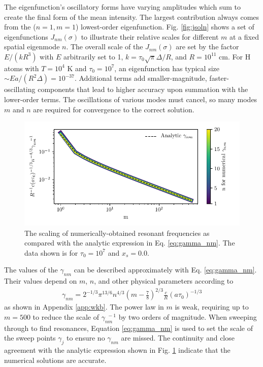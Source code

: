 \documentclass{aastex63}
\newcommand{\be}{\begin{eqnarray}}
\newcommand{\ee}{\end{eqnarray}}
\begin{document}
The eigenfunction's oscillatory forms have varying amplitudes which sum to create the final form of the mean intensity. The largest contribution always comes from the ($n=1, m=1$) lowest-order eigenfunction. Fig. \ref{fig:jsoln} shows a set of eigenfunctions $J_{nm}(\sigma)$ to illustrate their relative scales for different $m$ at a fixed spatial eigenmode $n$. The overall scale of the $J_{nm}(\sigma)$ are set by the factor $E/(kR^3)$ with $E$ arbitrarily set to 1, $k = \tau_0 \sqrt{\pi} \Delta / R$, and $R = 10^{11}$ cm. For H atoms with $T=10^4$ K and $\tau_0=10^7$, an eigenfunction has typical size ${\sim} E a / \left(R^2 \Delta \right) = 10^{-37}$. Additional terms add smaller-magnitude, faster-oscillating components that lead to higher accuracy upon summation with the lower-order terms. The oscillations of various modes must cancel, so many modes $m$ and $n$ are required for convergence to the correct solution. 
\begin{figure}
    \centering
    \includegraphics[width=\textwidth]{gamma_nm.pdf}
    \caption{The scaling of numerically-obtained resonant frequencies as compared with the analytic expression in Eq. \ref{eq:gamma_nm}. The data shown is for $\tau_0=10^7$ and $x_s=0.0$.}
    \label{fig:gamma_nm}
\end{figure}
The values of the $\gamma_{nm}$ can be described approximately with Eq. \ref{eq:gamma_nm}. Their values depend on $m$, $n$, and other physical parameters according to 
\be \label{eq:gamma_nm}
\gamma_{nm} = 2^{-1/3} \pi^{13/6} n^{4/3}\left(m-\frac{7}{8}\right)^{2/3}\frac{c}{R}(a\tau_0)^{-1/3}
\ee
as shown in Appendix \ref{app:wkb}. The power law in $m$ is weak, requiring up to $m=500$ to reduce the scale of $\gamma_{nm}^{\ \ -1}$ by two orders of magnitude. When sweeping through to find resonances, Equation \ref{eq:gamma_nm} is used to set the scale of the sweep points $\gamma_j$ to ensure no $\gamma_{nm}$ are missed. The continuity and close agreement with the analytic expression shown in Fig. \ref{fig:gamma_nm} indicate that the numerical solutions are accurate.
\end{document}
